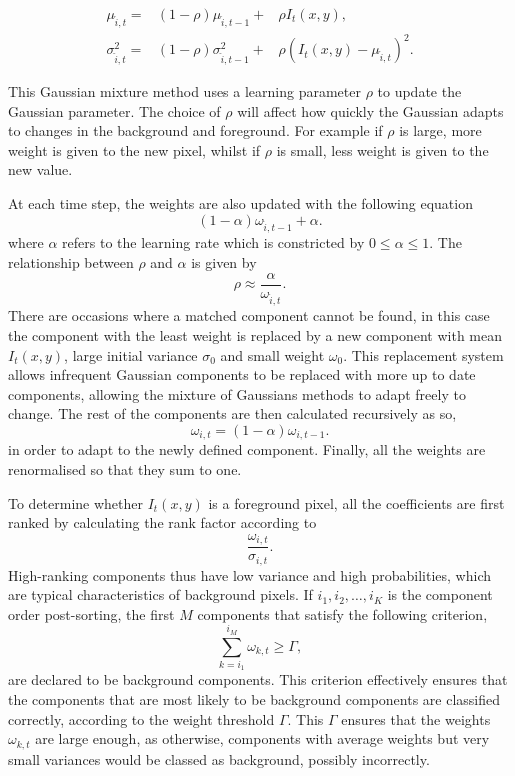 \begin{eqnarray}
  \label{eq:27}
\mu_{\hat{i},t } =& (1-\rho)\mu_{\hat{i},t-1} +& \rho I_t(x,y), \\
\sigma^2_{\hat{i},t} =& (1-\rho)\sigma^2_{\hat{i},t-1} +& \rho(I_t(x,y) - \mu_{\hat{i},t})^2.
\end{eqnarray}

This Gaussian mixture method uses a learning parameter $\rho$ to update the Gaussian parameter. The choice of $\rho$ will affect how quickly the Gaussian adapts to changes in the background and foreground. For example if $\rho$ is large, more weight is given to the new pixel, whilst if $\rho$ is small, less weight is given to the new value. 

At each time step, the weights are also updated with the following equation 
%
\begin{equation}
  \label{eq:28}
  (1-\alpha) \omega_{\hat{i},t-1} + \alpha.
\end{equation}
%
where $\alpha$ refers to the learning rate which is constricted by $0 \leq \alpha \leq 1$. The relationship between  $\rho$ and $\alpha$ is given by
%
\begin{equation}
  \label{eq:29}
  \rho \approx \frac{\alpha}{\omega_{\hat{i},t}}.
\end{equation}
%
There are occasions where a matched component cannot be found, in this case the component with the least weight is replaced by a new component with mean $I_t(x,y)$, large initial variance $\sigma_0$ and small weight $\omega_0$. This replacement system allows infrequent Gaussian components to be replaced with more up to date components, allowing the mixture of Gaussians methods to adapt freely to change. The rest of the components are then calculated recursively as so,
%
\begin{equation}
  \label{eq:210}
  \omega_{i,t} = (1-\alpha) \omega_{i,t-1}.
\end{equation}
%
in order to adapt to the newly defined component. Finally, all the weights are renormalised so that they sum to one.

To determine whether $I_t(x,y)$ is a foreground pixel, all the coefficients are first ranked by calculating the rank factor according to 
%
 \begin{equation}
   \label{eq:212}
   \frac{\omega_{i,t}}{\sigma_{i,t}}.
 \end{equation}
%
High-ranking components thus have low variance and high probabilities, which are typical characteristics of background pixels. If $i_1, i_2, \ldots, i_K$ is the component order post-sorting, the first $M$ components that satisfy the following criterion, 
%
   \begin{equation}
     \label{eq:211}
     \sum_{k=i_1}^{i_M}\omega_{k,t} \geq \Gamma,
   \end{equation}
%
are declared to be background components. This criterion effectively ensures that the components that are most likely to be background components are classified correctly, according to the weight threshold $\Gamma$. This $\Gamma$ ensures that the weights $\omega_{k,t}$ are large enough, as otherwise, components with average weights but very small variances would be classed as background, possibly incorrectly. 

